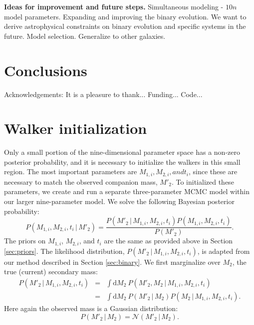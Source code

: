 \documentclass[12pt, preprint]{aastex}
\newcommand{\given}{\,|\,}
\newcommand{\dd}{\mathrm{d}}
\begin{document}
{\bf Ideas for improvement and future steps.} Simultaneous modeling - $10n$ model parameters. Expanding and improving the binary evolution. We want to derive astrophysical constraints on binary evolution and specific systems in the future. Model selection. Generalize to other galaxies.




\section{Conclusions}


\acknowledgements
Acknowledgements:
It is a pleasure to thank...
Funding...
Code...



\appendix

\section{Walker initialization} \label{sec:initialize}

Only a small portion of the nine-dimensional parameter space has a non-zero posterior probability, and it is necessary to initialize the walkers in this small region. The most important parameters are $M_{1,i}, M_{2,i}, and t_i$, since these are necessary to match the observed companion mass, $M'_2$. To initialized these parameters, we create and run a separate three-parameter MCMC model within our larger nine-parameter model. We solve the following Bayesian posterior probability:
\begin{equation}
P(M_{1,i}, M_{2,i}, t_i \given M'_2) = \frac{ P(M'_2 \given M_{1,i}, M_{2,i}, t_i ) P( M_{1,i}, M_{2,i}, t_i )}{P(M'_2)}.
\end{equation}
The priors on $M_{1,i}$, $M_{2,i}$, and $t_i$ are the same as provided above in Section \ref{sec:priors}. The likelihood distribution, $P(M'_2 \given M_{1,i}, M_{2,i}, t_i )$, is adapted from our method described in Section \ref{sec:binary}. We first marginalize over $M_2$, the true (current) secondary mass:
\begin{eqnarray}
P(M'_2 \given M_{1,i}, M_{2,i}, t_i ) &=& \int \dd M_2\ P(M'_2, M_2 \given M_{1,i}, M_{2,i}, t_i ) \nonumber \\
&=& \int \dd M_2\ P(M'_2 \given M_2) P(M_2 \given M_{1,i}, M_{2,i}, t_i).
\end{eqnarray}
Here again the observed mass is a Gaussian distribution: 
\begin{equation}
P(M'_2 \given M_2) = \mathcal{N}(M'_2 \given M_2).
\end{equation}
\end{document}
